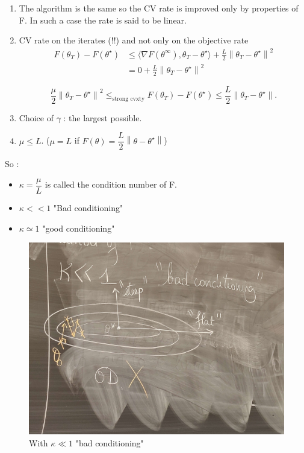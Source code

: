 \begin{note}
    \begin{enumerate}
        \item The algorithm is the same so the CV rate is improved only by properties of F. In such a case the rate is said to be linear.
        \item CV rate on the iterates (!!) and not only on the objective rate 
        \begin{align*}
            F(\theta _T) - F(\theta ^\star ) 
            &\leq \langle \nabla F(\theta ^\infty ), \theta _T - \theta  ^\star \rangle  + \frac{L}{2} \left\| \theta _T  - \theta ^\star \right\| ^2 \\
            &= 0 + \frac{L}{2} \left\| \theta _T  - \theta ^\star \right\| ^2
        \end{align*}
        
        \[
            \frac{\mu }{2} \left\| \theta _T - \theta ^\star  \right\| ^2 \leq_{\text{strong cvxty}}  F(\theta _T) - F(\theta ^\star ) \leq   \frac{L}{2} \left\| \theta _T  - \theta ^\star \right\|
        .\]
        \item Choice of $\gamma$ : the largest possible.
        \item $\mu \leq L$. ($\mu = L$ if $F(\theta)= \dfrac{L}{2}\left\| \theta - \theta ^ {\star} \right\| $)
    \end{enumerate}

    So : \begin{itemize}
        \item $\kappa = \dfrac{\mu}{L}$ is called the condition number of F.
        \item $\kappa << 1$ "Bad conditioning"
        \item $\kappa \simeq 1$ "good conditioning"
    \end{itemize}

    \begin{figure}[!htbp]
        \centering
        \includegraphics[width=.5\textwidth]{figs/bad_kappa.jpg}
        \caption{With $ \kappa \ll 1 $ "bad conditioning" }
    \end{figure}
    

\end{note}
